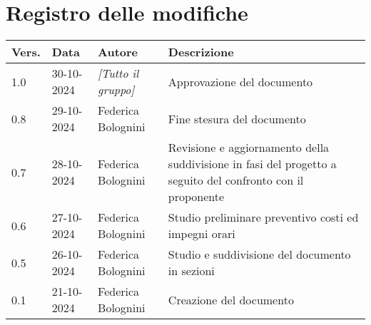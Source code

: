\section*{Registro delle modifiche}

\begin{table}[h]
    \centering
    \begin{tabular}{|l|l|l|p{5cm}|}
        \hline
        \rowcolor[gray]{0.9}
        \textbf{Vers.} & \textbf{Data} & \textbf{Autore} & \textbf{Descrizione}\\
        \hline
        1.0 & 30-10-2024 & \emph{[Tutto il gruppo]} & Approvazione del documento\\
        \hline
        0.8 & 29-10-2024 & Federica Bolognini & Fine stesura del documento\\
        \hline
        0.7 & 28-10-2024 & Federica Bolognini & Revisione e aggiornamento della suddivisione in fasi del progetto a seguito del confronto con il proponente\\
        \hline
        0.6 & 27-10-2024 & Federica Bolognini & Studio preliminare preventivo costi ed impegni orari\\
        \hline
        0.5 & 26-10-2024 & Federica Bolognini & Studio e suddivisione del documento in sezioni\\
        \hline
        0.1 & 21-10-2024 & Federica Bolognini & Creazione del documento\\
        \hline
    \end{tabular}
\end{table}
